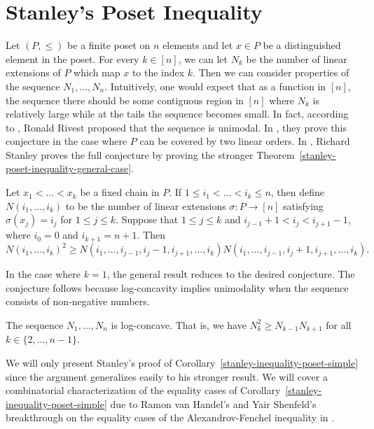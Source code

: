 \documentclass{puthesis-UG}
\begin{document}
\section{Stanley's Poset Inequality} \label{stanley-poset-inequality}

Let $(P, \leq)$ be a finite poset on $n$ elements and let $x \in P$ be a distinguished element in the poset. For every $k \in [n]$, we can let $N_k$ be the number of linear extensions of $P$ which map $x$ to the index $k$. Then we can consider properties of the sequence $N_1, \ldots, N_n$. Intuitively, one would expect that as a function in $[n]$, the sequence there should be some contiguous region in $[n]$ where $N_k$ is relatively large while at the tails the sequence becomes small. In fact, according to \cite{stanley-poset-inequality-origin}, Ronald Rivest proposed that the sequence is unimodal. In \cite{stanley-poset-inequality-origin}, they prove this conjecture in the case where $P$ can be covered by two linear orders. In \cite{STANLEY}, Richard Stanley proves the full conjecture by proving the stronger Theorem~\ref{stanley-poset-inequality-general-case}. 

\begin{thm} \label{stanley-poset-inequality-general-case}
	Let $x_1 < \ldots < x_k$ be a fixed chain in $P$. If $1 \leq i_1 < \ldots < i_k \leq n$, then define $N(i_1, \ldots, i_k)$ to be the number of linear extensions $\sigma : P \to [n]$ satisfying $\sigma (x_j) = i_j$ for $1 \leq j \leq k$. Suppose that $1 \leq j \leq k$ and $i_{j-1} + 1 < i_j < i_{j+1} - 1$, where $i_0 = 0$ and $i_{k+1} = n+1$. Then 
	\[
		N(i_1, \ldots, i_k)^2 \geq N(i_1, \ldots, i_{j-1}, i_j - 1, i_{j+1}, \ldots, i_k) N(i_1, \ldots, i_{j-1}, i_j + 1, i_{j+1}, \ldots, i_k).
	\]
\end{thm}

In the case where $k = 1$, the general result reduces to the desired conjecture. The conjecture follows because log-concavity implies unimodality when the sequence consists of non-negative numbers. 

\begin{cor} \label{stanley-inequality-poset-simple}
	The sequence $N_1, \ldots, N_n$ is log-concave. That is, we have $N_k^2 \geq N_{k-1}N_{k+1}$ for all $k \in \{2, \ldots, n-1\}.$
\end{cor}

We will only present Stanley's proof of Corollary~\ref{stanley-inequality-poset-simple} since the argument generalizes easily to his stronger result. We will cover a combinatorial characterization of the equality cases of Corollary~\ref{stanley-inequality-poset-simple} due to Ramon van Handel's and Yair Shenfeld's breakthrough on the equality cases of the Alexandrov-Fenchel inequality in \cite{shenfeld2022extremals}. 
\end{document}
